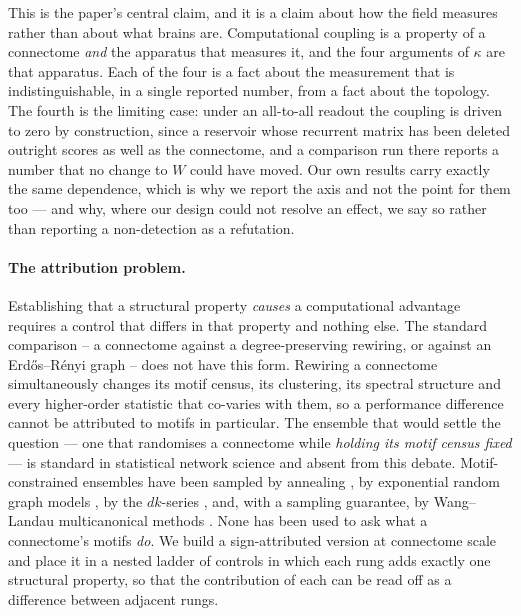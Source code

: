 This is the paper's central claim, and it is a claim about how the field measures rather
than about what brains are. Computational coupling is a property of a connectome
\emph{and} the apparatus that measures it, and the four arguments of $\kappa$ are that
apparatus. Each of the four is a fact about the measurement that is indistinguishable,
in a single reported number, from a fact about the topology. The fourth is the limiting
case: under an all-to-all readout the coupling is driven to zero by construction, since a
reservoir whose recurrent matrix has been deleted outright scores as well as the
connectome, and a comparison run there reports a number that no change to $W$ could have
moved. Our own
results carry exactly the same dependence, which is why we report the axis and not the
point for them too --- and why, where our design could not resolve an effect, we say so
rather than reporting a non-detection as a refutation.

\paragraph{The attribution problem.}
Establishing that a structural property \emph{causes} a computational advantage
requires a control that differs in that property and nothing else. The standard
comparison -- a connectome against a degree-preserving rewiring, or against an
Erd\H{o}s--R\'enyi graph -- does not have this form. Rewiring a connectome
simultaneously changes its motif census, its clustering, its spectral structure and
every higher-order statistic that co-varies with them, so a performance difference
cannot be attributed to motifs in particular. The ensemble that would settle the question --- one that randomises a connectome while
\emph{holding its motif census fixed} --- is standard in statistical network science and
absent from this debate. Motif-constrained ensembles have been sampled by annealing
\cite{milo2002network}, by exponential random graph models
\cite{frank1986markov,robins2007introduction}, by the $dk$-series
\cite{mahadevan2006systematic,orsini2015quantifying}, and, with a sampling guarantee, by
Wang--Landau multicanonical methods \cite{fischer2015sampling}. None has been used to ask
what a connectome's motifs \emph{do}. We build a sign-attributed version at connectome
scale and place it in a nested ladder of controls in which each rung adds exactly one
structural property, so that the contribution of each can be read off as a difference
between adjacent rungs.

